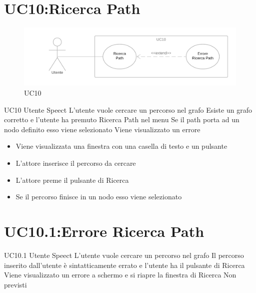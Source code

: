 \documentclass[../AnalisideiRequisiti.tex]{subfiles}
\begin{document}
\section{UC10:Ricerca Path}
\begin{figure}[htp]
	\caption{UC10}
	\centering
	\includegraphics[width=\textwidth]{../img/UC10.png}
\end{figure}
\UserCase
{UC10}
{Utente}
{Speect}
{L'utente vuole cercare un percorso nel grafo}
{Esiste un grafo corretto e l'utente ha premuto Ricerca Path nel menu}
{Se il path porta ad un nodo definito esso viene selezionato }
{Viene visualizzato un errore }
{
	\begin{itemize}
		\item{} Viene visualizzata una finestra con una casella di testo e un pulsante
		\item{} L'attore inserisce il percorso da cercare
		\item{} L'attore preme il pulsante di Ricerca
		\item{} Se il percorso finisce in un nodo esso viene selezionato 
 	\end{itemize}
}

\section{UC10.1:Errore Ricerca Path}
\UserCase
{UC10.1}
{Utente}
{Speect}
{L'utente vuole cercare un percorso nel grafo}
{Il percorso inserito dall'utente è sintatticamente errato e l'utente ha il pulsante di Ricerca}
{Viene visualizzato un errore a schermo e si riapre la finestra di Ricerca }
{Non previsti}
{}
\end{document}
